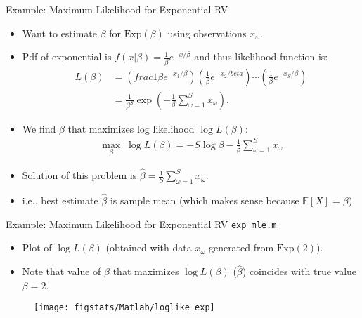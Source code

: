 \documentclass[9pt]{beamer}
\begin{document}
%
\begin{frame}{Example: Maximum Likelihood for Exponential RV}

\begin{itemize}
\item Want to estimate $\beta$ for $\textrm{Exp}(\beta)$ using observations $x_\omega$. 
\item Pdf of exponential is $f(x|\beta)=\frac{1}{\beta}e^{-x/\beta}$ and thus likelihood function is:
\begin{align*}
L(\beta)&=\left(frac{1}{\beta}e^{-x_1/\beta}\right)\left(\frac{1}{\beta}e^{-x_2/beta}\right)\cdots\left(\frac{1}{\beta}e^{-x_S/\beta}\right)\\
&=\frac{1}{\beta^S}\exp \left(-\frac{1}{\beta}\sum_{\omega=1}^Sx_\omega\right).
\end{align*}
\item We find $\beta$ that maximizes log likelihood $\log L(\beta)$:
\begin{align*}
\max_{\beta}\; \log L(\beta)=-S\log \beta -\frac{1}{\beta}\sum_{\omega=1}^Sx_\omega
\end{align*}
\item Solution of this problem is $\displaystyle\hat{\beta}=\frac{1}{S}\sum_{\omega=1}^Sx_\omega$.
\item i.e., best estimate $\hat{\beta}$ is sample mean (which makes sense because $\mathbb{E}[X]=\beta$). 
\end{itemize}


\end{frame}

%
\begin{frame}{Example: Maximum Likelihood for Exponential RV \footnotesize{\texttt{exp\_mle.m}}}

\begin{itemize}
\setlength{\itemsep}{5pt}
\item Plot of $\log L(\beta)$ (obtained with data $x_\omega$ generated from $\textrm{Exp}(2)$). 
\item Note that value of $\beta$ that maximizes $\log L(\beta)$ ($\hat{\beta}$) coincides with true value $\beta=2$. 
\end{itemize}
\begin{figure}[!htb]
    \centering
	\texttt{[image: figstats/Matlab/loglike\_exp]}
\end{figure}

\end{frame}
\end{document}
